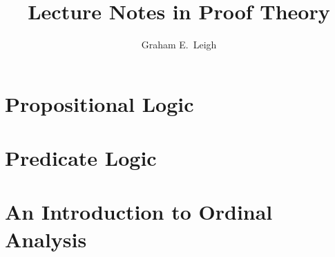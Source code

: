 \documentclass[%
	paper=174mm:247mm,
	11pt,
	DIV=10,
	leqno,
	titlepage,
	headsepline,
	headsepline=false,
	toc=bib,
	toc=sectionentrywithoutdots,
	toc=chapterentrywithoutdots
	unicode
	]%
	{scrbook}
\title{Lecture Notes in Proof Theory}
\author{Graham E.\ Leigh}
\begin{document}
\maketitle

\tableofcontents


%
\part{Propositional Logic}
%



%
\part{Predicate Logic}
%


%
\part{An Introduction to Ordinal Analysis}
%



\end{document}
